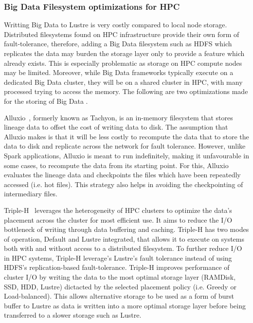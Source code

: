             \subsubsection{Big Data Filesystem optimizations for HPC}

                Writting Big Data to Lustre is very costly compared to local 
                node storage. Distributed filesystems found on HPC 
                infrastructure provide their own form of fault-tolerance, 
                therefore, adding a Big Data filesystem such as HDFS which 
                replicates the data may burden the storage layer only to 
                provide a feature which already exists. This is especially 
                problematic as storage on HPC compute nodes may be limited.
                Moreover, while Big Data frameworks typically execute on a 
                dedicated Big Data cluster, they will be on a shared cluster in
                HPC, with many processed trying to access the memory. The 
                following are two optimizations made for the storing of Big Data
                .

                Alluxio~\cite{Li:2014:TRM:2670979.2670985}, 
                formerly known as Tachyon, is an in-memory filesystem
                that stores lineage data to offset the cost of writing data to 
                disk. The assumption that Alluxio makes is that it will be less
                costly to recompute the data that to store the data to disk and
                replicate across the network for fault tolerance. However,
                unlike Spark applications, Alluxio is meant to run indefinitely,
                making it unfavourable in some cases, to recompute the data
                from its starting point. For this, Alluxio evaluates the 
                lineage data and checkpoints the files which have been 
                repeatedly accessed (i.e. hot files). This strategy also helps 
                in avoiding the checkpointing of intermediary files. 

                Triple-H~\cite{7152476} leverages the heterogeneity of HPC 
                clusters to 
                optimize the data's placement across the cluster for most 
                efficient use. It aims to reduce the I/O bottleneck of writing 
                through data buffering and caching. Triple-H has two modes of
                operation, Default and Lustre integrated,
                that allows it to execute on systems both with and without 
                access to a distributed filesystem. To further reduce I/O in
                HPC systems, Triple-H leverage's Lustre's fault tolerance 
                instead of using HDFS's replication-based fault-tolerance. 
                Triple-H improves 
                performance of cluster I/O by writing the data to
                the most optimal storage layer (RAMDisk, SSD, HDD, Lustre) 
                dictacted by the selected placement policy (i.e. Greedy or 
                Load-balanced). This allows alternative storage to be used as 
                a form of burst buffer to Lustre as data is written into a more
                optimal storage layer before being transferred to a slower 
                storage such as Lustre. 

